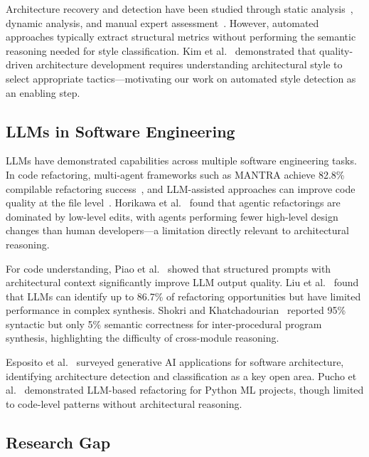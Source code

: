 \documentclass[runningheads]{llncs}
\begin{document}
Architecture recovery and detection have been studied through static analysis~\cite{lenarduzzi2023critical}, dynamic analysis, and manual expert assessment~\cite{shokri2024ipsynth}. However, automated approaches typically extract structural metrics without performing the semantic reasoning needed for style classification. Kim et al.~\cite{kim2009qualitydriven} demonstrated that quality-driven architecture development requires understanding architectural style to select appropriate tactics---motivating our work on automated style detection as an enabling step.

\subsection{LLMs in Software Engineering}

LLMs have demonstrated capabilities across multiple software engineering tasks. In code refactoring, multi-agent frameworks such as MANTRA achieve 82.8\% compilable refactoring success~\cite{xu2025mantra}, and LLM-assisted approaches can improve code quality at the file level~. Horikawa et al.~\cite{horikawa2025agentic} found that agentic refactorings are dominated by low-level edits, with agents performing fewer high-level design changes than human developers---a limitation directly relevant to architectural reasoning.

For code understanding, Piao et al.~\cite{piao2025refactoring} showed that structured prompts with architectural context significantly improve LLM output quality. Liu et al.~\cite{liu2025exploring} found that LLMs can identify up to 86.7\% of refactoring opportunities but have limited performance in complex synthesis. Shokri and Khatchadourian~\cite{shokri2024ipsynth} reported 95\% syntactic but only 5\% semantic correctness for inter-procedural program synthesis, highlighting the difficulty of cross-module reasoning.

Esposito et al.~\cite{esposito2025generative} surveyed generative AI applications for software architecture, identifying architecture detection and classification as a key open area. Pucho et al.~\cite{pucho2025refactoring} demonstrated LLM-based refactoring for Python ML projects, though limited to code-level patterns without architectural reasoning.

\subsection{Research Gap}
\end{document}
